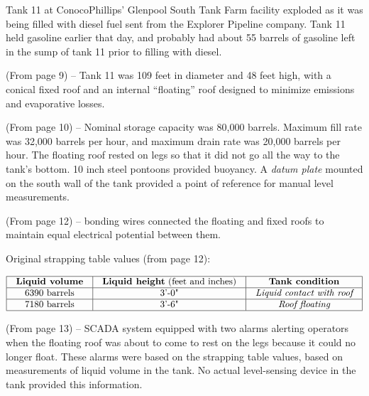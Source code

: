 





Tank 11 at ConocoPhillips' Glenpool South Tank Farm facility exploded as it was being filled with diesel fuel sent from the Explorer Pipeline company.  Tank 11 held gasoline earlier that day, and probably had about 55 barrels of gasoline left in the sump of tank 11 prior to filling with diesel.

\vskip 10pt

(From page 9) -- Tank 11 was 109 feet in diameter and 48 feet high, with a conical fixed roof and an internal ``floating'' roof designed to minimize emissions and evaporative losses.  

\vskip 10pt

(From page 10) -- Nominal storage capacity was 80,000 barrels.  Maximum fill rate was 32,000 barrels per hour, and maximum drain rate was 20,000 barrels per hour.  The floating roof rested on legs so that it did not go all the way to the tank's bottom.  10 inch steel pontoons provided buoyancy.  A {\it datum plate} mounted on the south wall of the tank provided a point of reference for manual level measurements.

\vskip 10pt

(From page 12) -- bonding wires connected the floating and fixed roofs to maintain equal electrical potential between them.

\vskip 10pt

Original strapping table values (from page 12):


$$\vbox{\offinterlineskip
\halign{\strut
\vrule \quad\hfil # \ \hfil & 
\vrule \quad\hfil # \ \hfil & 
\vrule \quad\hfil # \ \hfil \vrule \cr
\noalign{\hrule}
%
{\bf Liquid volume} & {\bf Liquid height} (feet and inches) & {\bf Tank condition} \cr
%
\noalign{\hrule}
%
6390 barrels & 3'-0" & {\it Liquid contact with roof} \cr
%
\noalign{\hrule}
%
7180 barrels & 3'-6" & {\it Roof floating} \cr
%
\noalign{\hrule}
} %
}$$ %

\vskip 10pt

(From page 13) -- SCADA system equipped with two alarms alerting operators when the floating roof was about to come to rest on the legs because it could no longer float.  These alarms were based on the strapping table values, based on measurements of liquid volume in the tank.  No actual level-sensing device in the tank provided this information.

